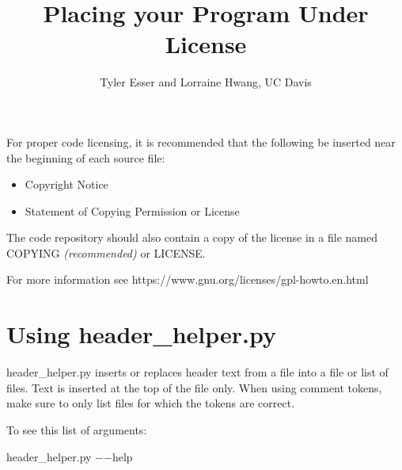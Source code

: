 \documentclass[11pt, oneside]{article}   	%
\title{\textbf{Placing your Program Under License}}
\author{Tyler Esser and Lorraine Hwang, UC Davis}
\begin{document}
\maketitle




For proper code licensing, it is recommended that the following be inserted near the beginning of each source file:
 \begin{itemize}
  \item Copyright Notice
  \item Statement of Copying Permission or License
\end{itemize}

The code repository should also contain a copy of the license in a file named COPYING \textit{(recommended)} or LICENSE.

For more information see https://www.gnu.org/licenses/gpl-howto.en.html

\section{Using header\_helper.py}
header\_helper.py inserts or replaces  header text from a file into a file or list of files.  Text is inserted at the top of the file only.  When using comment tokens, make sure to only list files for which the tokens are correct. 

To see this  list of arguments:
\begin{addmargin}[3em]{2em}
{\selectfont 
header\_helper.py $-$$-$help
}
\end{addmargin}
\end{document}
